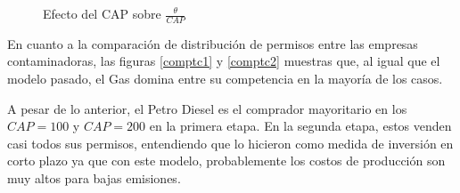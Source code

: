 \begin{figure}[H]
\centering
{}
\caption{{\footnotesize Efecto del CAP sobre $\frac{\theta}{CAP}$}}
\label{rendcapTC2}
\end{figure}

En cuanto a la comparación de distribución de permisos entre las empresas contaminadoras, las figuras \ref{comptc1} y \ref{comptc2} muestras que, al igual que el modelo pasado, el Gas domina entre su competencia en la mayoría de los casos. 
\vspace{2.5mm}

A pesar de lo anterior, el Petro Diesel es el comprador mayoritario en los $CAP= 100$ y $CAP=200$ en la primera etapa. En la segunda etapa, estos venden casi todos sus permisos, entendiendo que lo hicieron como medida de inversión en corto plazo ya que con este modelo, probablemente los costos de producción son muy altos para bajas emisiones.
\vspace{2.5mm}

